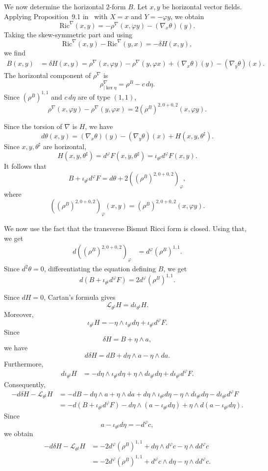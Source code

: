 \documentclass{article}
\makeatletter
\renewenvironment{proof}[1][\proofname]{%
  \par\pushQED{\qed}%
  \normalfont\topsep6\p@\@plus6\p@\relax
  \trivlist
  \item[\hskip\labelsep
        \textbf{\textup{#1}}\@addpunct{.}]\ignorespaces
}{%
  \popQED\endtrivlist\@endpefalse
}
\theoremstyle{definition}
\newcommand{\Ric}{\mathrm{Ric}}
\renewcommand{\phi}{\varphi}
\numberwithin{equation}{section}
\makeatother
\begin{document}
\begin{proof}
We now determine the horizontal $2$-form $B$. Let $x,y$ be horizontal vector fields. Applying Proposition~9.1 in~\cite{FI} with $X=x$ and $Y=-\phi y$, we obtain
\[
\Ric^\nabla(x,y)
=
-\rho^\nabla(x,\phi y)-(\nabla_x\theta)(y).
\]
Taking the skew-symmetric part and using
\[
\Ric^\nabla(x,y)-\Ric^\nabla(y,x)
=
-\delta H(x,y),
\]
we find
\[
\begin{aligned}
B(x,y)
&=
\delta H(x,y)=
\rho^\nabla(x,\phi y)
-\rho^\nabla(y,\phi x)
+(\nabla_x\theta)(y)
-(\nabla_y\theta)(x).
\end{aligned}
\]
The horizontal component of $\rho^\nabla$ is
\[
\rho^\nabla_{\lvert\ker\eta}
=
\rho^B-c\,d\eta.
\]
Since $(\rho^B)^{1,1}$ and $c\,d\eta$ are of type $(1,1)$,
\[
\rho^\nabla(x,\phi y)-\rho^\nabla(y,\phi x)
=
2(\rho^B)^{2,0+0,2}(x,\phi y).
\]

Since the torsion of $\nabla$ is $H$, we have
\[
d\theta(x,y)
=
(\nabla_x\theta)(y)
-(\nabla_y\theta)(x)
+
H(x,y,\theta^\sharp).
\]
Since $x,y,\theta^\sharp$ are horizontal,
\[
H(x,y,\theta^\sharp)
=
d^\phi F(x,y,\theta^\sharp)
=
\iota_{\theta^\sharp}d^\phi F(x,y).
\]
It follows that
\[
B+\iota_{\theta^\sharp}d^\phi F
=
d\theta
+
2\left((\rho^B)^{2,0+0,2}\right)_\phi,
\]
where
\[
\left((\rho^B)^{2,0+0,2}\right)_\phi(x,y)
=
(\rho^B)^{2,0+0,2}(x,\phi y).
\]

We now use the fact that the transverse Bismut Ricci form is closed. Using that, we get
\[
\begin{aligned}
d\left((\rho^B)^{2,0+0,2}\right)_\phi
&=
d^\phi(\rho^B)^{1,1}.
\end{aligned}
\]
Since $d^2\theta=0$, differentiating the equation defining $B$, we get
\[
d\left(
B+\iota_{\theta^\sharp}d^\phi F
\right)
=
2d^\phi(\rho^B)^{1,1}.
\]

Since $dH=0$, Cartan's formula gives
\[
\mathcal L_{\theta^\sharp}H
=
d\iota_{\theta^\sharp}H.
\]
Moreover,
\[
\iota_{\theta^\sharp}H
=
-\eta\wedge\iota_{\theta^\sharp}d\eta
+
\iota_{\theta^\sharp}d^\phi F.
\]
Since
\[
\delta H=B+\eta\wedge a,
\]
we have
\[
d\delta H
=
dB+d\eta\wedge a-\eta\wedge da.
\]
Furthermore,
\[
\begin{aligned}
d\iota_{\theta^\sharp}H
&=
-d\eta\wedge\iota_{\theta^\sharp}d\eta
+\eta\wedge d\iota_{\theta^\sharp}d\eta
+d\iota_{\theta^\sharp}d^\phi F.
\end{aligned}
\]
Consequently,
\[
\begin{aligned}
-d\delta H-\mathcal L_{\theta^\sharp}H
&=
-dB-d\eta\wedge a+\eta\wedge da
+d\eta\wedge\iota_{\theta^\sharp}d\eta
-\eta\wedge d\iota_{\theta^\sharp}d\eta
-d\iota_{\theta^\sharp}d^\phi F\\
&=
-d\left(
B+\iota_{\theta^\sharp}d^\phi F
\right)
-d\eta\wedge
\left(
a-\iota_{\theta^\sharp}d\eta
\right)
+\eta\wedge
d\left(
a-\iota_{\theta^\sharp}d\eta
\right).
\end{aligned}
\]
Since
\[
a-\iota_{\theta^\sharp}d\eta
=
-d^\phi c,
\]
we obtain
\[
\begin{aligned}
-d\delta H-\mathcal L_{\theta^\sharp}H
&=
-2d^\phi(\rho^B)^{1,1}
+d\eta\wedge d^\phi c
-\eta\wedge dd^\phi c\\
&=
-2d^\phi(\rho^B)^{1,1}
+d^\phi c\wedge d\eta
-\eta\wedge dd^\phi c.
\end{aligned}
\]


\end{proof}
\end{document}
